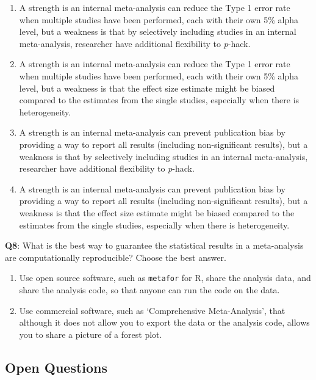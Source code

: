 \documentclass[
  oneside]{krantz}
\providecommand{\tightlist}{%
  \setlength{\itemsep}{0pt}\setlength{\parskip}{0pt}}
\begin{document}
\begin{enumerate}
\def\labelenumi{\Alph{enumi})}
\tightlist
\item
  A strength is an internal meta-analysis can reduce the Type 1 error rate when multiple studies have been performed, each with their own 5\% alpha level, but a weakness is that by selectively including studies in an internal meta-analysis, researcher have additional flexibility to \emph{p}-hack.
\item
  A strength is an internal meta-analysis can reduce the Type 1 error rate when multiple studies have been performed, each with their own 5\% alpha level, but a weakness is that the effect size estimate might be biased compared to the estimates from the single studies, especially when there is heterogeneity.
\item
  A strength is an internal meta-analysis can prevent publication bias by providing a way to report all results (including non-significant results), but a weakness is that by selectively including studies in an internal meta-analysis, researcher have additional flexibility to \emph{p}-hack.
\item
  A strength is an internal meta-analysis can prevent publication bias by providing a way to report all results (including non-significant results), but a weakness is that the effect size estimate might be biased compared to the estimates from the single studies, especially when there is heterogeneity.
\end{enumerate}

\textbf{Q8}: What is the best way to guarantee the statistical results in a meta-analysis are computationally reproducible? Choose the best answer.

\begin{enumerate}
\def\labelenumi{\Alph{enumi})}
\tightlist
\item
  Use open source software, such as \texttt{metafor} for R, share the analysis data, and share the analysis code, so that anyone can run the code on the data.
\item
  Use commercial software, such as `Comprehensive Meta-Analysis', that although it does not allow you to export the data or the analysis code, allows you to share a picture of a forest plot.
\end{enumerate}

\hypertarget{open-questions-9}{%
\subsection{Open Questions}\label{open-questions-9}}
\end{document}
